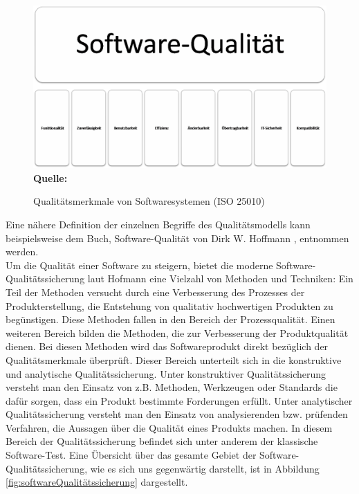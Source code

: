 \begin{figure}[htb]
  \centering  
  \includegraphics[scale=0.7]{img/softwarequalitaet25010.png}\\
  \footnotesize\sffamily\textbf{Quelle:} \cite{iso/iec_iso/iec_2011}
  \caption{Qualitätsmerkmale von Softwaresystemen (ISO 25010)}
  \label{fig:qualitaetsmerkmaleVonSoftwaresystemen}
\end{figure}
Eine nähere Definition der einzelnen Begriffe des Qualitätsmodells kann beispielsweise dem Buch, Software-Qualität von Dirk W. Hoffmann \cite[S.7 ff.]{hoffmann_software-qualitat_2013}, entnommen werden.\\
Um die Qualität einer Software zu steigern, bietet die moderne Software-Qualitätssicherung laut Hofmann \cite[vgl. S.19 ff.]{hoffmann_software-qualitat_2013} eine Vielzahl von Methoden und Techniken:
Ein Teil der Methoden versucht durch eine Verbesserung des Prozesses der Produkterstellung, die Entstehung von qualitativ hochwertigen Produkten zu begünstigen. Diese Methoden fallen in den Bereich der Prozessqualität.
Einen weiteren Bereich bilden die Methoden, die zur Verbesserung der Produktqualität dienen. Bei diesen Methoden wird das Softwareprodukt direkt bezüglich der Qualitätsmerkmale überprüft. Dieser Bereich unterteilt sich in die konstruktive und analytische Qualitätssicherung. Unter konstruktiver Qualitätssicherung versteht man den Einsatz von z.B. Methoden, Werkzeugen oder Standards die
dafür sorgen, dass ein Produkt bestimmte Forderungen erfüllt. 
Unter analytischer Qualitätssicherung versteht man den Einsatz von analysierenden bzw. prüfenden Verfahren, die Aussagen
über die Qualität eines Produkts machen.
In diesem Bereich der Qualitätssicherung befindet sich unter anderem der klassische Software-Test. Eine Übersicht über das gesamte Gebiet der Software-Qualitätssicherung, wie es sich uns gegenwärtig darstellt, ist in Abbildung \ref{fig:softwareQualitätssicherung} dargestellt. 
